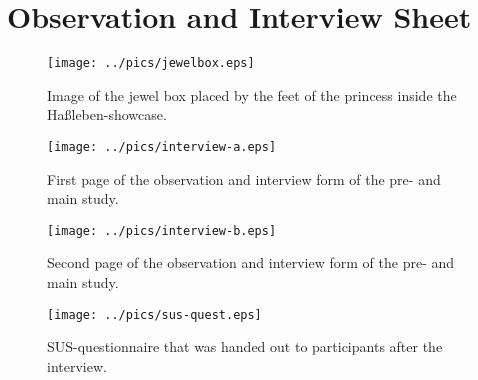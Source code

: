 \chapter{Observation and Interview Sheet}
\label{appendix_box}

\begin{figure}[H]%
\texttt{[image: ../pics/jewelbox.eps]}%
\caption*{Image of the jewel box placed by the feet of the princess inside the Ha\ss leben-showcase.}%
\end{figure}



\begin{figure}[H]%
\texttt{[image: ../pics/interview-a.eps]}%
\caption*{First page of the observation and interview form of the pre- and main study.}%
\end{figure}

\begin{figure}[H]%
\texttt{[image: ../pics/interview-b.eps]}%
\caption*{Second page of the observation and interview form of the pre- and main study.}%
\end{figure}



\begin{figure}[H]%
\texttt{[image: ../pics/sus-quest.eps]}%
\caption*{SUS-questionnaire that was handed out to participants after the interview.}%
\end{figure}
